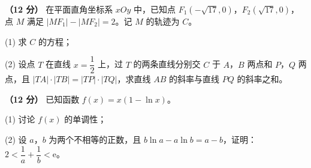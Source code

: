 \textbf{（12 分）} 在平面直角坐标系 $xOy$ 中，已知点 $F_1\left(-\sqrt{17},0\right)$，$F_2\left(\sqrt{17},0\right)$，点 $M$ 满足 $\left|MF_1\right|-\left|MF_2\right|=2$。记 $M$ 的轨迹为 $C$。

  (1) 求 $C$ 的方程；

  (2) 设点 $T$ 在直线 $x=\dfrac12$ 上，过 $T$ 的两条直线分别交 $C$ 于 $A$，$B$ 两点和 $P$，$Q$ 两点，且 $|TA|\cdot|TB|=|TP|\cdot|TQ|$，求直线 $AB$ 的斜率与直线 $PQ$ 的斜率之和。

\textbf{（12 分）} 已知函数 $f(x)=x(1-\ln x)$。

  (1) 讨论 $f(x)$ 的单调性；

  (2) 设 $a$，$b$ 为两个不相等的正数，且 $b\ln a-a\ln b=a-b$，证明：$2<\dfrac1a+\dfrac1b<\mathrm e$。

\par\medskip

